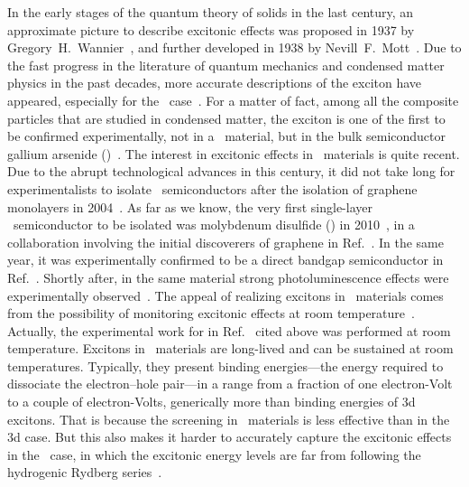 In the early stages of the quantum theory of solids in the last century, an approximate picture to describe excitonic effects was proposed in 1937 by Gregory~H.~Wannier~\cite{Wannier_1937}, and further developed in 1938 by Nevill~F.~Mott~\cite{Mott_Littleton_1938,Mott_1938_II,Mott_1938_III}.
Due to the fast progress in the literature of quantum mechanics and condensed matter physics in the past decades, more accurate descriptions of the exciton have appeared, especially for the \bd~case~\cite{Colloquium_Excitons_2018,Mauricio_2022}.
For a matter of fact, among all the composite particles that are studied in condensed matter, the exciton is one of the first to be confirmed experimentally, not in a \bd~material, but in the bulk semiconductor gallium arsenide ()~\cite{PhysRevLett.49.1281,PhysRevLett.57.2446}.
The interest in excitonic effects in \bd~materials is quite recent.
Due to the abrupt technological advances in this century, it did not take long for experimentalists to isolate \bd~semiconductors after the isolation of graphene monolayers in 2004~\cite{Novoselov_Geim_2004}.
As far as we know, the very first single-layer \bd~semiconductor to be isolated was molybdenum disulfide () in 2010~\cite{Novoselov_Jiang_Schedin_Booth_Khotkevich_Morozov_Geim_2005}, in a collaboration involving the initial discoverers of graphene in Ref.~\cite{Novoselov_Geim_2004}.
In the same year, it was experimentally confirmed to be a direct bandgap semiconductor in Ref.~\cite{PhysRevLett.105.136805}.
Shortly after, in the same material strong photoluminescence effects were experimentally observed~\cite{Photoluminescence_MoS2}.
The appeal of realizing excitons in \bd~materials comes from the possibility of monitoring excitonic effects at room temperature~\cite{Flatten_He_Coles_Trichet_Powell_Taylor_Warner_Smith_2016,Fang_Yao_Wang_2023}.
Actually, the experimental work for  in Ref.~\cite{da_Jornada_Zhang_2014} cited above was performed at room temperature.
Excitons in \bd~materials are long-lived and can be sustained at room temperatures.
Typically, they present binding energies---the energy required to dissociate the electron--hole pair---in a range from a fraction of one electron-Volt to a couple of electron-Volts, generically more than binding energies of \gls{3d} excitons.
That is because the screening in \bd~materials is less effective than in the \gls{3d} case.
But this also makes it harder to accurately capture the excitonic effects in the \bd~case, in which the excitonic energy levels are far from following the hydrogenic Rydberg series~\cite{Chernikov_2014,Thygesen_2017,Olsen_Latini_Rasmussen_Thygesen_2016}.

